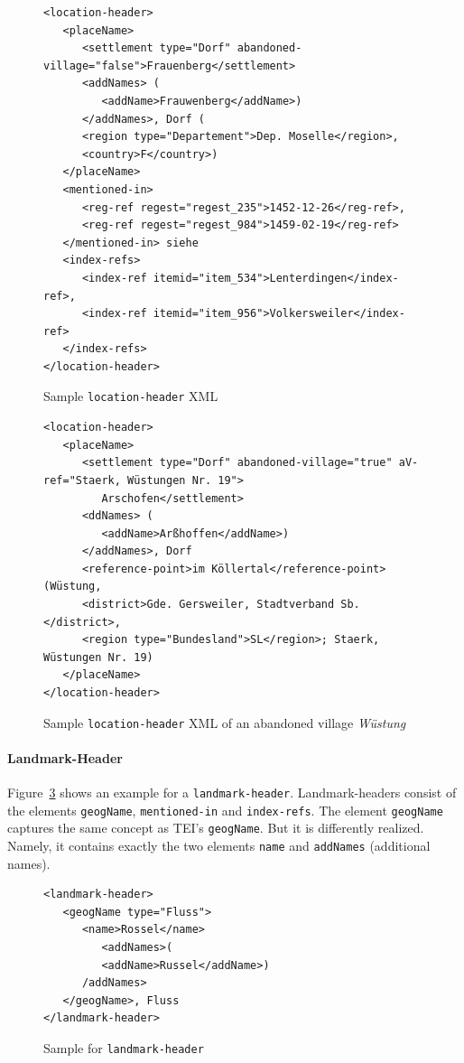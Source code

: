 \begin{figure}[H]
\centering
\begin{verbatim}
<location-header>
   <placeName>
      <settlement type="Dorf" abandoned-village="false">Frauenberg</settlement>
      <addNames> (
         <addName>Frauwenberg</addName>)
      </addNames>, Dorf (
      <region type="Departement">Dep. Moselle</region>,
      <country>F</country>)
   </placeName>
   <mentioned-in>
      <reg-ref regest="regest_235">1452-12-26</reg-ref>,
      <reg-ref regest="regest_984">1459-02-19</reg-ref>
   </mentioned-in> siehe
   <index-refs>
      <index-ref itemid="item_534">Lenterdingen</index-ref>,
      <index-ref itemid="item_956">Volkersweiler</index-ref>
   </index-refs>
</location-header>
\end{verbatim}
\caption{Sample \texttt{location-header} XML}
\label{fig:location-header-xml}
\end{figure}

\begin{figure}[H]
\centering
\begin{verbatim}
<location-header>
   <placeName>
      <settlement type="Dorf" abandoned-village="true" aV-ref="Staerk, Wüstungen Nr. 19">
         Arschofen</settlement>
      <ddNames> (
         <addName>Arßhoffen</addName>)
      </addNames>, Dorf
      <reference-point>im Köllertal</reference-point> (Wüstung,
      <district>Gde. Gersweiler, Stadtverband Sb.</district>,
      <region type="Bundesland">SL</region>; Staerk, Wüstungen Nr. 19)
   </placeName>
</location-header>
\end{verbatim}
\caption{Sample \texttt{location-header} XML of an abandoned village
  \textit{Wüstung}}
\label{fig:location-wuest-xml}
\end{figure}

\paragraph{Landmark-Header}
Figure~\ref{fig:landmark-header-xml} shows an example for a
\texttt{landmark-header}. Landmark-headers consist of the elements
\texttt{geogName}, \texttt{mentioned-in} and \texttt{index-refs}. The
element \texttt{geogName} captures the same concept as TEI's
\texttt{geogName}. But it is differently realized. Namely, it contains
exactly the two elements \texttt{name} and \texttt{addNames}
(additional names).

\begin{figure}[H]
\centering
\begin{verbatim}
<landmark-header>
   <geogName type="Fluss">
      <name>Rossel</name>
         <addNames>(
         <addName>Russel</addName>)
      /addNames>
   </geogName>, Fluss
</landmark-header>
\end{verbatim}
\caption{Sample for \texttt{landmark-header}}
\label{fig:landmark-header-xml}
\end{figure}

